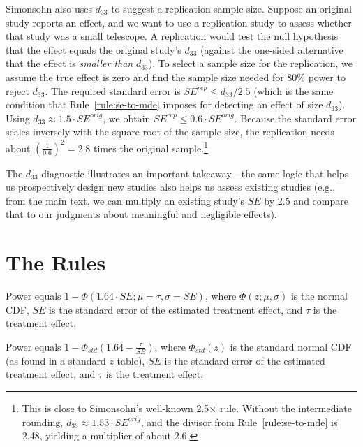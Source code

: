 \documentclass[12pt]{article}
\begin{document}
Simonsohn also uses $d_{33}$ to suggest a replication sample size.
Suppose an original study reports an effect, and we want to use a replication study to assess whether that study was a small telescope.
A replication would test the null hypothesis that the effect equals the original study's $d_{33}$ (against the one-sided alternative that the effect is \emph{smaller than} $d_{33}$).
To select a sample size for the replication, we assume the true effect is zero and find the sample size needed for 80\% power to reject $d_{33}$.
The required standard error is $SE^{rep} \leq d_{33}/2.5$ (which is the same condition that Rule~\ref{rule:se-to-mde} imposes for detecting an effect of size $d_{33}$).
Using $d_{33} \approx 1.5 \cdot SE^{orig}$, we obtain $SE^{rep} \leq 0.6 \cdot SE^{orig}$.
Because the standard error scales inversely with the square root of the sample size, the replication needs about $\left(\frac{1}{0.6}\right)^2 = 2.8$ times the original sample.\footnote{This is close to Simonsohn's well-known 2.5$\times$ rule. Without the intermediate rounding, $d_{33} \approx 1.53 \cdot SE^{orig}$, and the divisor from Rule~\ref{rule:se-to-mde} is 2.48, yielding a multiplier of about 2.6.}

The $d_{33}$ diagnostic illustrates an important takeaway---the same logic that helps us prospectively design new studies also helps us assess existing studies (e.g., from the main text, we can multiply an existing study's $SE$ by 2.5 and compare that to our judgments about meaningful and negligible effects).

\section{The Rules}\label{app:rules}

\begin{rule0}
\label{rule:power-int}
Power equals $1 - \Phi(1.64 \cdot SE;\mu = \tau,\sigma = SE)$, where $\Phi(z;\mu,\sigma)$ is the normal CDF, $SE$ is the standard error of the estimated treatment effect, and $\tau$ is the treatment effect.
\end{rule0}
\begin{rule0}
\label{rule:power-z}
Power equals $1 - \Phi_{std}\left( 1.64 - \frac{\tau}{SE} \right)$, where $\Phi_{std}(z)$ is the standard normal CDF (as found in a standard $z$ table), $SE$ is the standard error of the estimated treatment effect, and $\tau$ is the treatment effect.
\end{rule0}
\end{document}
